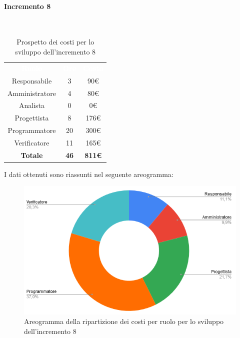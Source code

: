\paragraph*{Incremento 8}\mbox{} \\
\begin{table}[H]
\centering\renewcommand{\arraystretch}{1.5}
\caption{Prospetto dei costi per lo sviluppo dell'incremento 8}
\vspace{0.2cm}
\begin{tabular}{ c c c }
\rowcolor{redafk}
\textcolor{white}{\textbf{Ruolo}} & \textcolor{white}{\textbf{Ore}} &
\textcolor{white}{\textbf{Costo}}  \\
Responsabile & 3 & 90€ \\
Amministratore & 4 & 80€ \\
Analista & 0 & 0€ \\
Progettista & 8 & 176€ \\
Programmatore & 20 & 300€  \\
Verificatore & 11 & 165€  \\
\rowcolor{lastrowcolor}
\textbf{Totale} & \textbf{46} & \textbf{811€}  \\
\end{tabular}
\end{table}
 
I dati ottenuti sono riassunti nel seguente areogramma:
\begin{figure}[H]
\centering
\includegraphics[scale=0.60]{img/grafici/torta_inc8.png}
\caption{Areogramma della ripartizione dei costi per ruolo per lo sviluppo dell'incremento 8}
\end{figure}

